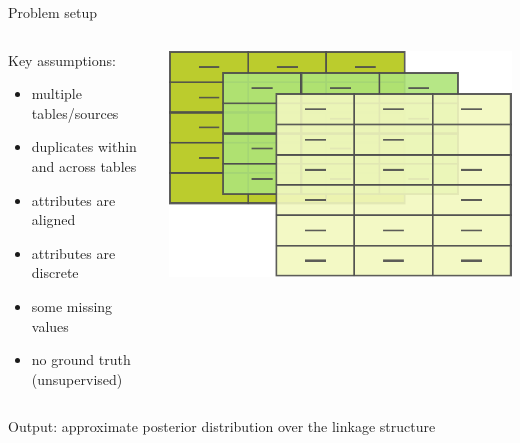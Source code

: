 \documentclass[compress]{beamer}
\newcommand{\1}[1]{\mathbb{I}\!\left[#1\right]} %
\theoremstyle{plain}
\begin{document}
\begin{frame}{Problem setup}
  \setlength{\leftmargini}{1.1em}
  \begin{columns}[onlytextwidth]
    \begin{column}{0.5\linewidth}
      Key assumptions:
      \begin{itemize}
        \item multiple tables\slash sources
        \item duplicates within and across tables
        \item attributes are aligned
        \item attributes are discrete
        \item some missing values
        \item no ground truth (unsupervised)
      \end{itemize}
    \end{column}
    \hfill
    \begin{column}{0.4\linewidth}
      \includegraphics[width=\linewidth]{finalFigures/multiple-datasets.pdf}
    \end{column}
  \end{columns}
  \pause
  \bigskip

  Output: approximate posterior distribution over the linkage structure
\end{frame}
\end{document}
